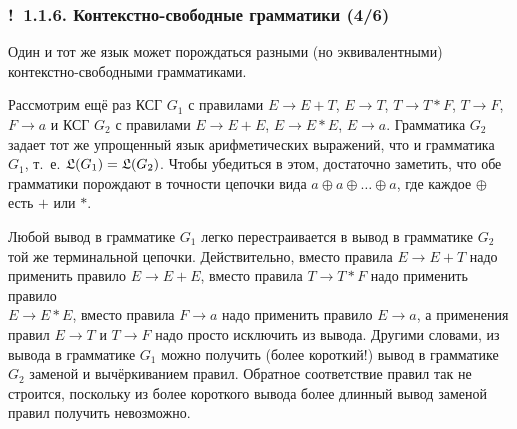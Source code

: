 \documentclass[mathserif,12pt,aspectratio=169]{beamer}
\def\Ok{{\color{green}\textbf{!}\ }}
\begin{document}
\begin{frame}


\frametitle{\Ok 1.1.6. Контекстно-свободные грамматики (4/6)}
Один и тот же язык может порождаться
разными (но эквивалентными) контекстно-свобод\-ными грамматиками.

\smallskip
\begin{example}
Рассмотрим ещё раз КСГ $G_1$ с правилами
$E\rightarrow E+T$,
$E\rightarrow T$,
$T\rightarrow T*F$,
$T\rightarrow F$,
$F\rightarrow a$ и КСГ
$G_2$ с правилами
$E\rightarrow E+E$,
$E\rightarrow E*E$,
$E\rightarrow a$.
Грамматика $G_2$  задает тот же
упрощенный язык арифметических выражений,
что и грамматика $G_1$, т.~е. $\frak{L}(G_1)=\frak{L}(G_2)$.
Чтобы убедиться в этом, достаточно заметить,
что обе грамматики порождают в точности цепочки вида
$a\oplus a\oplus\dots\oplus a$, где каждое $\oplus$ есть $+$ или $*$.
\end{example}

\begin{remark}
Любой вывод в грамматике $G_1$
легко перестраивается в вывод
в грамматике $G_2$ той же терминальной
цепочки.
Действительно, вместо правила
$E\rightarrow E+T$ надо применить правило
 $E\rightarrow E+E$,
вместо правила $T\rightarrow T*F$
 надо применить правило\\
$E\rightarrow E*E$,
вместо правила $F\rightarrow a$ надо применить правило
 $E\rightarrow a$,
а применения правил
$E\rightarrow T$ и
$T\rightarrow F$ надо просто исключить из вывода.
Другими словами, из вывода в грамматике $G_1$
можно получить (более короткий!) вывод в грамматике $G_2$ 
заменой и вычёркиванием правил.
Обратное соответствие правил так не строится,
поскольку из более короткого вывода более длинный вывод заменой правил получить
невозможно.   
\end{remark}

\end{frame}
\end{document}
